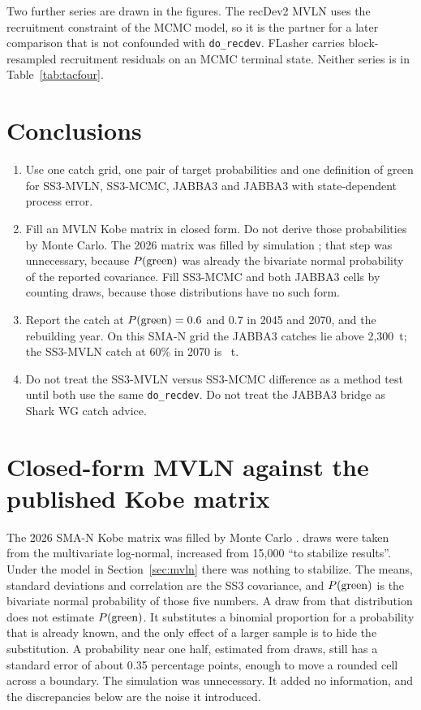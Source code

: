 \documentclass[11pt,a4paper]{article}
\begin{document}
Two further series are drawn in the figures. The recDev2 MVLN uses the
recruitment constraint of the MCMC model, so it is the partner for a later
comparison that is not confounded with \texttt{do\_recdev}. FLasher carries
block-resampled recruitment residuals on an MCMC terminal state. Neither
series is in Table~\ref{tab:tacfour}.

\section{Conclusions}
\begin{enumerate}[leftmargin=*]
  \item Use one catch grid, one pair of target probabilities and one
    definition of green for SS3-MVLN, SS3-MCMC, JABBA3 and JABBA3 with
    state-dependent process error.
  \item Fill an MVLN Kobe matrix in closed form. Do not derive those
    probabilities by Monte Carlo. The 2026 matrix was filled by simulation
    \citep{Liniers2026}; that step was unnecessary, because $P(\mathrm{green})$ was
    already the bivariate normal probability of the reported covariance.
    Fill SS3-MCMC and both JABBA3 cells by counting draws, because those
    distributions have no such form.
  \item Report the catch at $P(\mathrm{green}) = 0.6$ and $0.7$ in 2045 and 2070, and the
    rebuilding year. On this SMA-N grid the JABBA3 catches lie above
    2{,}300~t; the SS3-MVLN catch at 60\% in 2070 is \tacMvlnSeventySixty~t.
  \item Do not treat the SS3-MVLN versus SS3-MCMC difference as a method
    test until both use the same \texttt{do\_recdev}. Do not treat the
    JABBA3 bridge as Shark WG catch advice.
\end{enumerate}

\appendix
\renewcommand\thesection{Appendix \Alph{section}.}
\section{Closed-form MVLN against the published Kobe matrix}
\label{app:mvln}

The 2026 SMA-N Kobe matrix was filled by Monte Carlo
\citep{Liniers2026}. \linN{} draws were taken from the multivariate
log-normal, increased from 15{,}000 ``to stabilize results''. Under the
model in Section~\ref{sec:mvln} there was nothing to stabilize. The means,
standard deviations and correlation are the SS3 covariance, and $P(\mathrm{green})$ is
the bivariate normal probability of those five numbers. A draw from that
distribution does not estimate $P(\mathrm{green})$. It substitutes a binomial proportion
for a probability that is already known, and the only effect of a larger
sample is to hide the substitution. A probability near one half, estimated
from \linN{} draws, still has a standard error of about 0.35 percentage
points, enough to move a rounded cell across a boundary. The simulation was
unnecessary. It added no information, and the discrepancies below are the
noise it introduced.
\end{document}
